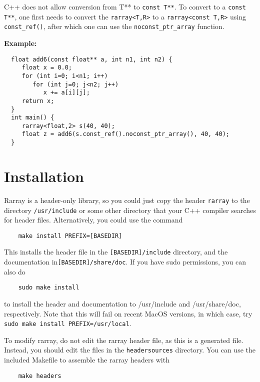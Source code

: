 \documentclass[11pt,twoside]{article}
\begin{document}
C++ does not allow conversion from T** to \texttt{const T**}. To convert to a \texttt{const T**}, one first needs to convert the \texttt{rarray{\tt<}T,R{\tt>}} to a \texttt{rarray{\tt<}const T,R{\tt>}} using \texttt{const\_ref()}, after which one can use the \texttt{noconst\_ptr\_array} function.

\noindent
{\bf Example:}
\vspace{-5pt}\begin{framed}\vspace{-14pt}%
\begin{verbatim}
  float add6(const float** a, int n1, int n2) {
     float x = 0.0;
     for (int i=0; i<n1; i++)
        for (int j=0; j<n2; j++)
           x += a[i][j];
     return x;
  }
  int main() {
     rarray<float,2> s(40, 40);
     float z = add6(s.const_ref().noconst_ptr_array(), 40, 40);
  }
\end{verbatim}%
\vspace{-14pt} 
\end{framed}

\pagebreak
\appendix

\section{Installation}

Rarray is a header-only library, so you could just copy the header \texttt{rarray} to the directory \texttt{/usr/include} or some other directory
that your C++ compiler searches for header files.  Alternatively, you could use the command
\begin{verbatim}
    make install PREFIX=[BASEDIR]
\end{verbatim}
This installs the header file in the \texttt{[BASEDIR]/include} directory,
and the documentation in\linebreak \texttt{[BASEDIR]/share/doc}.
If you have sudo permissions, you can also do
\begin{verbatim}
    sudo make install
\end{verbatim}
to install the header and documentation to /usr/include and /usr/share/doc,
respectively. Note that this will fail on recent MacOS versions,
in which case, try \texttt{sudo make install PREFIX=/usr/local}.

To modify rarray, do not edit the rarray header file, as this is a generated file. Instead, you
should edit the files in the \texttt{headersources} directory.  You
can use the included Makefile to assemble the rarray headers with
\begin{verbatim}
    make headers
\end{verbatim}
\end{document}
